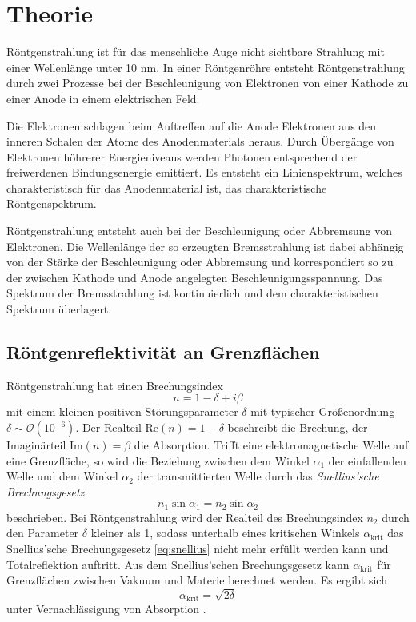 \section{Theorie}
Röntgenstrahlung ist für das menschliche Auge nicht sichtbare Strahlung mit einer Wellenlänge unter 10 nm.
In einer Röntgenröhre entsteht Röntgenstrahlung durch zwei Prozesse bei der Beschleunigung von 
Elektronen von einer Kathode zu einer Anode in einem elektrischen Feld. 

Die Elektronen schlagen
beim Auftreffen auf die Anode Elektronen aus den inneren Schalen der Atome des Anodenmaterials heraus. 
Durch Übergänge von Elektronen höhrerer Energieniveaus werden Photonen entsprechend der 
freiwerdenen Bindungsenergie emittiert. Es entsteht ein Linienspektrum, welches charakteristisch für das 
Anodenmaterial ist, das charakteristische Röntgenspektrum. 

Röntgenstrahlung entsteht auch bei der Beschleunigung oder Abbremsung von Elektronen. Die 
Wellenlänge der so erzeugten Bremsstrahlung ist dabei abhängig von der Stärke der Beschleunigung oder 
Abbremsung und korrespondiert so zu der zwischen Kathode und Anode angelegten Beschleunigungsspannung.
Das Spektrum der Bremsstrahlung ist kontinuierlich und dem charakteristischen Spektrum überlagert.

\subsection*{Röntgenreflektivität an Grenzflächen}
Röntgenstrahlung hat einen Brechungsindex
\begin{equation*}
    n = 1 - \delta + i \beta
\end{equation*}
mit einem kleinen positiven Störungsparameter $\delta$ mit typischer Größenordnung 
$\delta \sim \mathcal{O}(10^{-6})$. Der Realteil $\text{Re}(n) = 1-\delta$ beschreibt die Brechung, der
Imaginärteil $\text{Im}(n) = \beta$ die Absorption.
Trifft eine elektromagnetische Welle auf eine Grenzfläche, so wird die Beziehung zwischen dem Winkel 
$\alpha_1$ der einfallenden Welle und dem Winkel $\alpha_2$ der transmittierten Welle durch das 
\textit{Snellius'sche Brechungsgesetz}
\begin{equation}
    n_1 \sin \alpha_1 = n_2 \sin \alpha_2 
    \label{eq:snellius}
\end{equation}
beschrieben. Bei Röntgenstrahlung wird der Realteil des Brechungsindex $n_2$ durch den Parameter $\delta$ 
kleiner als 1, sodass unterhalb eines kritischen Winkels $\alpha_\text{krit}$ das Snellius'sche Brechungsgesetz
\ref{eq:snellius} nicht mehr erfüllt werden kann und Totalreflektion auftritt.
Aus dem Snellius'schen Brechungsgesetz kann $\alpha_\text{krit}$ für Grenzflächen zwischen Vakuum und 
Materie berechnet werden. Es ergibt sich 
\begin{equation*}
    \label{eqn:krit}
    \alpha_\text{krit} = \sqrt{2 \delta}
\end{equation*}
unter Vernachlässigung von Absorption \cite{dissertation2}.

